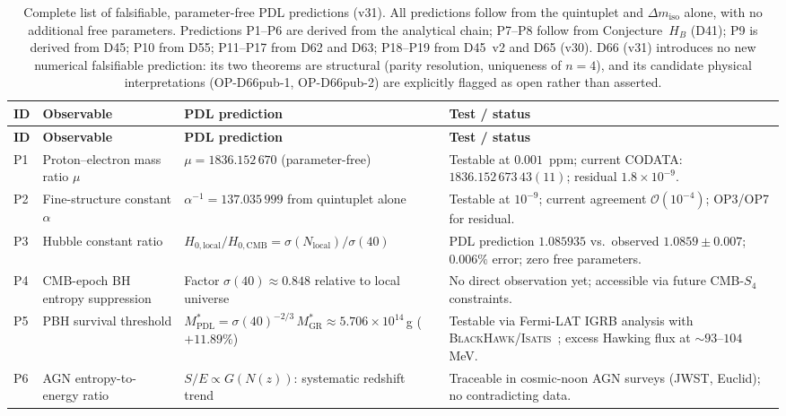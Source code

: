 \documentclass[11pt,a4paper]{article}
\theoremstyle{plain}
\theoremstyle{definition}
\theoremstyle{remark}
\begin{document}
\begin{longtable}{L{0.5cm}L{3.2cm}L{5.2cm}L{4.2cm}}
\caption{Complete list of falsifiable, parameter-free PDL predictions (v31). All predictions follow from the quintuplet and $\Delta m_{\mathrm{iso}}$ alone, with no additional free parameters. Predictions P1--P6 are derived from the analytical chain; P7--P8 follow from Conjecture~$H_B$ (D41); P9 is derived from D45; P10 from D55; P11--P17 from D62 and D63; P18--P19 from D45~v2 and D65 (v30). D66 (v31) introduces no new numerical falsifiable prediction: its two theorems are structural (parity resolution, uniqueness of $n=4$), and its candidate physical interpretations (OP-D66pub-1, OP-D66pub-2) are explicitly flagged as open rather than asserted.}
\label{tab:predictions}\\
\toprule
\textbf{ID} & \textbf{Observable} & \textbf{PDL prediction} & \textbf{Test / status}\\
\midrule
\endfirsthead
\toprule
\textbf{ID} & \textbf{Observable} & \textbf{PDL prediction} & \textbf{Test / status}\\
\midrule
\endhead
\bottomrule
\endfoot
P1 & Proton--electron mass ratio $\mu$ & $\mu=1836.152\,670$ (parameter-free) & Testable at $0.001$~ppm; current CODATA: $1836.152\,673\,43(11)$; residual $1.8\times10^{-9}$.\\[0.4em]
P2 & Fine-structure constant $\alpha$ & $\alpha^{-1}=137.035\,999$ from quintuplet alone & Testable at $10^{-9}$; current agreement $\mathcal{O}(10^{-4})$; OP3/OP7 for residual.\\[0.4em]
P3 & Hubble constant ratio & $H_{0,\mathrm{local}}/H_{0,\mathrm{CMB}}=\sigma(N_{\mathrm{local}})/\sigma(40)$ & PDL prediction $1.085935$ vs.\ observed $1.0859\pm0.007$; $0.006\%$ error; zero free parameters.\\[0.4em]
P4 & CMB-epoch BH entropy suppression & Factor $\sigma(40)\approx 0.848$ relative to local universe & No direct observation yet; accessible via future CMB-$S_4$ constraints.\\[0.4em]
P5 & PBH survival threshold & $M^*_{\mathrm{PDL}}=\sigma(40)^{-2/3}\,M^*_{\mathrm{GR}}\approx 5.706\times10^{14}$\,g ($+11.89\%$) & Testable via Fermi-LAT IGRB analysis with \textsc{BlackHawk}/\textsc{Isatis}~\cite{D45}; excess Hawking flux at $\sim93$--$104$\,MeV.\\[0.4em]
P6 & AGN entropy-to-energy ratio & $S/E\propto G(N(z))$: systematic redshift trend & Traceable in cosmic-noon AGN surveys (JWST, Euclid); no contradicting data.\\[0.4em]

\end{longtable}
\end{document}
